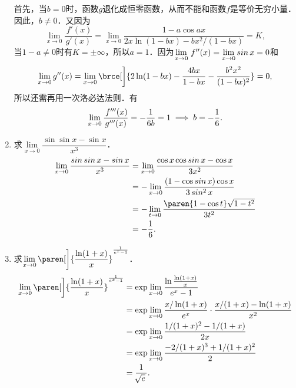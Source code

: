 \begin{enumerate}
  \ifshowsol
    首先，当\(b = 0\)时，函数\(g\)退化成恒零函数，从而不能和函数\(f\)是等价无穷小量．因此，\(b \ne 0\)．又因为
    \begin{equation*}
      \lim_{x\to0} \frac{\,f'(x)}{g'(x)}
      = \lim_{x\to0} \frac{1-a\cos ax}{2x\ln(1-bx) - bx^2\!/(1-bx)}
      = K,
    \end{equation*}
    当\(1-a \ne 0\)时有\(K = \pm\infty\)，所以\(a = 1\)．因为\(\lim\limits_{x\to0}\,f''(x) = \lim\limits_{x\to0} \operatorname{\smash{sin}} x = 0\)和
    \begin{equation*}
      \lim_{x\to0} g\dpr(x)
      = \lim_{x\to0} {}\brce[\bigg]{2\ln(1-bx) - \frac{4bx}{1-bx} - \frac{b^2x^2}{(1-bx)^2}}
      = 0,
    \end{equation*}
    所以还需再用一次洛必达法则．有
    \begin{equation*}
      \lim_{x\to0} \frac{\,f'''(x)}{g'''(x)}
      = -\frac{1}{6b} = 1
      \implies
      b = -\frac16.
    \end{equation*}
  \fi

\item 求\(\lim\limits_{x\to0} \dfrac{\sin\sin x - \sin x}{x^3}\)．
  \ifshowsol
    \begin{equation*}
      \begin{split}
        \lim_{x\to0} \frac{\sin\sin x - \sin x}{x^3}
        &= \lim_{x\to0} \frac{\cos x \cos\sin x - \cos x}{3x^2} \\
        &= - \lim_{x\to0} \frac{(1 - \cos\sin x) \cos x}{3\sin^2 x} \\
        &= - \lim_{t\to0} \frac{\paren{1 - \cos t} \sqrt{1-t^2}}{3t^2} \\
        &= - \frac16.
      \end{split}
    \end{equation*}
  \fi
  
\item 求\(\lim\limits_{x\to0} {}\paren[\bigg]{\dfrac{\ln(1+x)}{x}}^{\frac1{e^x-1}}\)．
  \ifshowsol
    \begin{equation*}
      \begin{split}
        \lim_{x\to0} \paren[\bigg]{\frac{\ln(1+x)}{x}}^{\frac1{e^x-1}}
        &= \exp \lim_{x\to0} \frac{\ln\frac{\ln(1+x)}{x}}{e^x-1} \\
        &= \exp \lim_{x\to0} \frac{x/\ln(1+x)}{e^x} \cdot \frac{x/(1+x)-\ln(1+x)}{x^2} \\
        &= \exp \lim_{x\to0} \frac{1/(1+x)^2 - 1/(1+x)}{2x} \\
        &= \exp \lim_{x\to0} \frac{-2/(1+x)^3 + 1/(1+x)^2}{2} \\
        &= \frac1{\!\sqrt e\,}.
      \end{split}
    \end{equation*}
  \fi
  

\end{enumerate}
